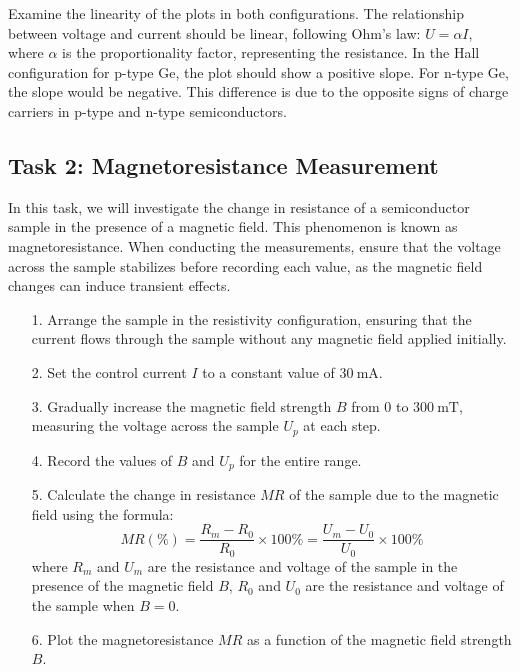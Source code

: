 \documentclass[11pt]{article}
\begin{document}
	Examine the linearity of the plots in both configurations. The relationship between voltage and current should be linear, following Ohm's law: \(U = \alpha I\), where \(\alpha\) is the proportionality factor, representing the resistance. In the Hall configuration for p-type Ge, the plot should show a positive slope. For n-type Ge, the slope would be negative. This difference is due to the opposite signs of charge carriers in p-type and n-type semiconductors.
	
\clearpage
	
	\subsection{Task 2: Magnetoresistance Measurement}
	
	In this task, we will investigate the change in resistance of a semiconductor sample in the presence of a magnetic field. This phenomenon is known as magnetoresistance. When conducting the measurements, ensure that the voltage across the sample stabilizes before recording each value, as the magnetic field changes can induce transient effects.
	
	\begin{enumerate}
		\item[1.] Arrange the sample in the resistivity configuration, ensuring that the current flows through the sample without any magnetic field applied initially.
		\item[2.] Set the control current $I$ to a constant value of $\qty{30}{\milli\ampere}$.
		\item[3.] Gradually increase the magnetic field strength \(B\) from $0$ to $\qty{300}{\milli\tesla}$, measuring the voltage across the sample \(U_p\) at each step.
		\item[4.] Record the values of \(B\) and \(U_p\) for the entire range.
		\item[5.] Calculate the change in resistance \(MR\) of the sample due to the magnetic field using the formula:
		\begin{equation}
			MR(\%) = \frac{R_m - R_0}{R_0} \times 100\% = \frac{U_m - U_0}{U_0} \times 100\% \label{eq:7}
		\end{equation}
		where \(R_m\) and \(U_m\) are the resistance and voltage of the sample in the presence of the magnetic field \(B\), \(R_0\) and \(U_0\) are the resistance and voltage of the sample when \(B = 0\).
		\item[6.] Plot the magnetoresistance \(MR\) as a function of the magnetic field strength \(B\).
	\end{enumerate}
	
\end{document}
